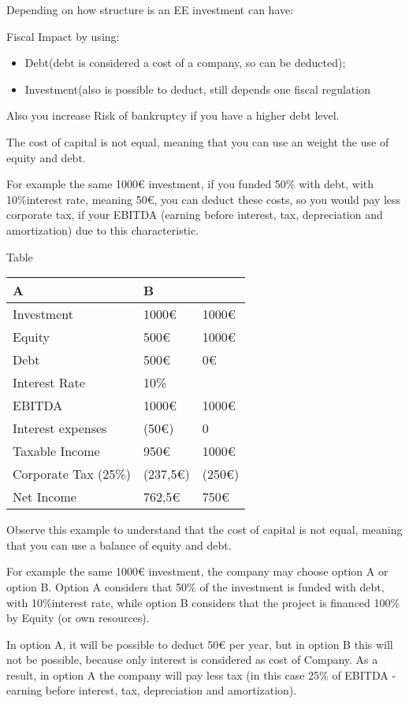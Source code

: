 \documentclass[]{book}
\newcommand{\euro}{€}
\providecommand{\tightlist}{%
  \setlength{\itemsep}{0pt}\setlength{\parskip}{0pt}}
\theoremstyle{definition}
\theoremstyle{definition}
\theoremstyle{definition}
\theoremstyle{remark}
\begin{document}
Depending on how structure is an EE investment can have:

Fiscal Impact by using:

\begin{itemize}
\tightlist
\item
  Debt(debt is considered a cost of a company, so can be deducted);
\item
  Investment(also is possible to deduct, still depends one fiscal
  regulation
\end{itemize}

Also you increase Risk of bankruptcy if you have a higher debt level.

The cost of capital is not equal, meaning that you can use an weight the
use of equity and debt.

For example the same 1000\euro{} investment, if you funded 50\% with
debt, with 10\%interest rate, meaning 50\euro{}, you can deduct these
costs, so you would pay less corporate tax, if your EBITDA (earning
before interest, tax, depreciation and amortization) due to this
characteristic.

Table

\begin{longtable}[]{@{}lll@{}}
\toprule
A & B\tabularnewline
\midrule
\endhead
Investment & 1000\euro{} & 1000\euro{}\tabularnewline
Equity & 500\euro{} & 1000\euro{}\tabularnewline
Debt & 500\euro{} & 0\euro{}\tabularnewline
Interest Rate & 10\% &\tabularnewline
EBITDA & 1000\euro{} & 1000\euro{}\tabularnewline
Interest expenses & (50\euro{}) & 0\tabularnewline
Taxable Income & 950\euro{} & 1000\euro{}\tabularnewline
Corporate Tax (25\%) & (237,5\euro{}) & (250\euro{})\tabularnewline
Net Income & 762,5\euro{} & 750\euro{}\tabularnewline
\bottomrule
\end{longtable}

Observe this example to understand that the cost of capital is not
equal, meaning that you can use a balance of equity and debt.

For example the same 1000\euro{} investment, the company may choose
option A or option B. Option A considers that 50\% of the investment is
funded with debt, with 10\%interest rate, while option B considers that
the project is financed 100\% by Equity (or own resources).

In option A, it will be possible to deduct 50\euro{} per year, but in
option B this will not be possible, because only interest is considered
as cost of Company. As a result, in option A the company will pay less
tax (in this case 25\% of EBITDA -earning before interest, tax,
depreciation and amortization).
\end{document}
